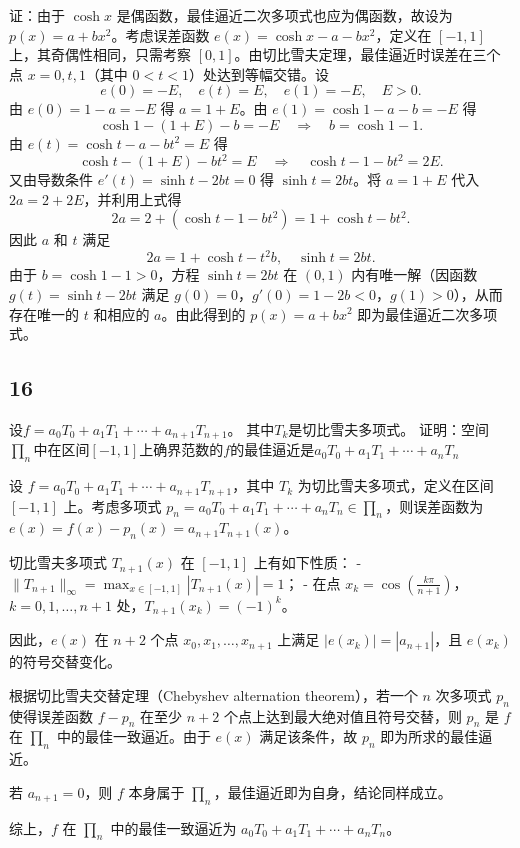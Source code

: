 \documentclass{article}
\begin{document}
证：由于 \(\cosh x\) 是偶函数，最佳逼近二次多项式也应为偶函数，故设为 \(p(x) = a + b x^2\)。考虑误差函数 \(e(x) = \cosh x - a - b x^2\)，定义在 \([-1,1]\) 上，其奇偶性相同，只需考察 \([0,1]\)。由切比雪夫定理，最佳逼近时误差在三个点 \(x=0, t, 1\)（其中 \(0 < t < 1\)）处达到等幅交错。设
\[
e(0) = -E, \quad e(t) = E, \quad e(1) = -E, \quad E > 0.
\]
由 \(e(0) = 1 - a = -E\) 得 \(a = 1 + E\)。由 \(e(1) = \cosh 1 - a - b = -E\) 得
\[
\cosh 1 - (1+E) - b = -E \quad \Rightarrow \quad b = \cosh 1 - 1.
\]
由 \(e(t) = \cosh t - a - b t^2 = E\) 得
\[
\cosh t - (1+E) - b t^2 = E \quad \Rightarrow \quad \cosh t - 1 - b t^2 = 2E.
\]
又由导数条件 \(e'(t) = \sinh t - 2b t = 0\) 得 \(\sinh t = 2b t\)。将 \(a = 1+E\) 代入 \(2a = 2 + 2E\)，并利用上式得
\[
2a = 2 + (\cosh t - 1 - b t^2) = 1 + \cosh t - b t^2.
\]
因此 \(a\) 和 \(t\) 满足
\[
2a = 1 + \cosh t - t^2 b, \quad \sinh t = 2b t.
\]
由于 \(b = \cosh 1 - 1 > 0\)，方程 \(\sinh t = 2b t\) 在 \((0,1)\) 内有唯一解（因函数 \(g(t)=\sinh t - 2b t\) 满足 \(g(0)=0\)，\(g'(0)=1-2b<0\)，\(g(1)>0\)），从而存在唯一的 \(t\) 和相应的 \(a\)。由此得到的 \(p(x)=a+bx^2\) 即为最佳逼近二次多项式。

\subsection*{16}

设$f= a_0T_0+a_1T_1 + \cdots + a_{n+1}T_{n+1}$。
其中$T_k$是切比雪夫多项式。
证明：空间$\prod_n$中在区间$[-1,1]$上确界范数的$f$的最佳逼近是$a_0T_0+a_1T_1 + \cdots + a_{n}T_{n}$


设 $f = a_0 T_0 + a_1 T_1 + \cdots + a_{n+1} T_{n+1}$，其中 $T_k$ 为切比雪夫多项式，定义在区间 $[-1,1]$ 上。考虑多项式 $p_n = a_0 T_0 + a_1 T_1 + \cdots + a_n T_n \in \prod_n$，则误差函数为 $e(x) = f(x) - p_n(x) = a_{n+1} T_{n+1}(x)$。

切比雪夫多项式 $T_{n+1}(x)$ 在 $[-1,1]$ 上有如下性质：
- $\|T_{n+1}\|_\infty = \max_{x\in[-1,1]} |T_{n+1}(x)| = 1$；
- 在点 $x_k = \cos\left(\frac{k\pi}{n+1}\right)$，$k=0,1,\dots,n+1$ 处，$T_{n+1}(x_k) = (-1)^k$。

因此，$e(x)$ 在 $n+2$ 个点 $x_0, x_1, \dots, x_{n+1}$ 上满足 $|e(x_k)| = |a_{n+1}|$，且 $e(x_k)$ 的符号交替变化。

根据切比雪夫交替定理（Chebyshev alternation theorem），若一个 $n$ 次多项式 $p_n$ 使得误差函数 $f-p_n$ 在至少 $n+2$ 个点上达到最大绝对值且符号交替，则 $p_n$ 是 $f$ 在 $\prod_n$ 中的最佳一致逼近。由于 $e(x)$ 满足该条件，故 $p_n$ 即为所求的最佳逼近。

若 $a_{n+1}=0$，则 $f$ 本身属于 $\prod_n$，最佳逼近即为自身，结论同样成立。

综上，$f$ 在 $\prod_n$ 中的最佳一致逼近为 $a_0 T_0 + a_1 T_1 + \cdots + a_n T_n$。
\end{document}
